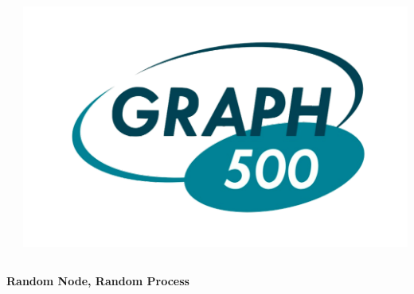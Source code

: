 \documentclass[final]{beamer} %
\begin{document}
\begin{frame}[t]
\begin{columns}[t]
\begin{column}{0.60\paperwidth}
\begin{columns}[t,totalwidth=0.60\paperwidth]
\begin{column}{0.28\paperwidth}
\begin{columns}[t,totalwidth=0.28\paperwidth]
\begin{column}{0.12\paperwidth}
							\end{column}
							\begin{column}{0.12\paperwidth}
								\begin{center} \includegraphics[width=0.12\paperwidth]{img/logo_graph500} \end{center}
							\end{column}
						\end{columns}
					\end{column}
				\end{columns}
				\begin{columns}[t,totalwidth=0.60\paperwidth]
					\begin{column}{0.28\paperwidth}
						\begin{center} \bf{Random Node, Random Process} \end{center}
						\begin{columns}[t,totalwidth=0.28\paperwidth]
							\begin{column}{0.12\paperwidth}

\end{column}
\end{columns}
\end{column}
\end{columns}
\end{column}
\end{columns}
\end{frame}
\end{document}
